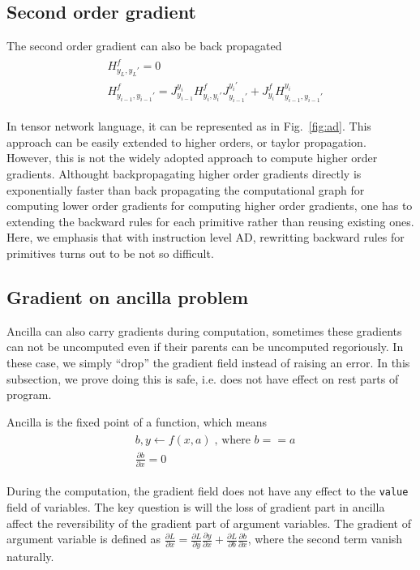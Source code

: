 \documentclass[aps,twocolumn,longbibliography,english,superscriptaddress,prr]{revtex4-1}
\newcommand{\<}{\langle}
\renewcommand{\>}{\rangle}
\newcommand{\Fig}[1]{Fig.~\ref{#1}}
\theoremstyle{definition}\newtheorem{definition}{\textit{Definition}}
\begin{document}
\subsection{Second order gradient}
The second order gradient can also be back propagated
\begin{align}
    \begin{split}
        &H^f_{y_L,y_L'} = 0\\
        &H^f_{y_{i-1},y_{i-1}'} = J^{y_i}_{y_{i-1}} H^f_{y_i, y_i'} J^{y_i'}_{y_{i-1}'} + J^f_{y_i} H^{y_i}_{y_{i-1}, y_{i-1}'}
    \end{split}
\end{align}

In tensor network language, it can be represented as in \Fig{fig:ad}.
This approach can be easily extended to higher orders, or taylor propagation.
However, this is not the widely adopted approach to compute higher order gradients.
Althought backpropagating higher order gradients directly is exponentially faster than back propagating the computational graph for computing lower order gradients for computing higher order gradients, one has to extending the backward rules for each primitive rather than reusing existing ones.
Here, we emphasis that with instruction level AD, rewritting backward rules for primitives turns out to be not so difficult.

\subsection{Gradient on ancilla problem}
Ancilla can also carry gradients during computation, sometimes these gradients can not be uncomputed even if their parents can be uncomputed regoriously. In these case, we simply ``drop'' the gradient field instead of raising an error. In this subsection, we prove doing this is safe, i.e. does not have effect on rest parts of program.

Ancilla is the fixed point of a function, which means 
\begin{align}
    \begin{split}
    &b, y \leftarrow f(x, a)\; \text{, where } b==a\\
    &\frac{\partial b}{\partial x} = 0
    \end{split}
\end{align}

During the computation, the gradient field does not have any effect to the \texttt{value} field of variables. The key question is will the loss of gradient part in ancilla affect the reversibility of the gradient part of argument variables.
The gradient of argument variable is defined as $\frac{\partial L}{\partial x} = \frac{\partial L}{\partial y}\frac{\partial y}{\partial x} + \frac{\partial L}{\partial b}\frac{\partial b}{\partial x}$, where the second term vanish naturally.
\end{document}
